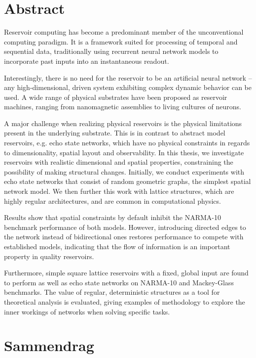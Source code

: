 \chapter*{Abstract}

Reservoir computing has become a predominant member of the unconventional
computing paradigm. It is a framework suited for processing of temporal and
sequential data, traditionally using recurrent neural network models to
incorporate past inputs into an instantaneous readout.

Interestingly, there is no need for the reservoir to be an artificial neural
network -- any high-dimensional, driven system exhibiting complex dynamic
behavior can be used. A wide range of physical substrates have been proposed as
reservoir machines, ranging from nanomagnetic assemblies to living cultures of
neurons.

A major challenge when realizing physical reservoirs is the physical limitations
present in the underlying substrate. This is in contrast to abstract model
reservoirs, e.g. echo state networks, which have no physical constraints in
regards to dimensionality, spatial layout and observability. In this thesis, we
investigate reservoirs with realistic dimensional and spatial properties,
constraining the possibility of making structural changes. Initially, we conduct
experiments with echo state networks that consist of random geometric graphs,
the simplest spatial network model. We then further this work with lattice
structures, which are highly regular architectures, and are common in
computational physics.

Results show that spatial constraints by default inhibit the NARMA-10 benchmark
performance of both models. However, introducing directed edges to the network
instead of bidirectional ones restores performance to compete with established
models, indicating that the flow of information is an important property in
quality reservoirs.

Furthermore, simple square lattice reservoirs with a fixed, global input are
found to perform as well as echo state networks on NARMA-10 and Mackey-Glass
benchmarks. The value of regular, deterministic structures as a tool for
theoretical analysis is evaluated, giving examples of methodology to explore the
inner workings of networks when solving specific tasks.

\chapter*{Sammendrag}

